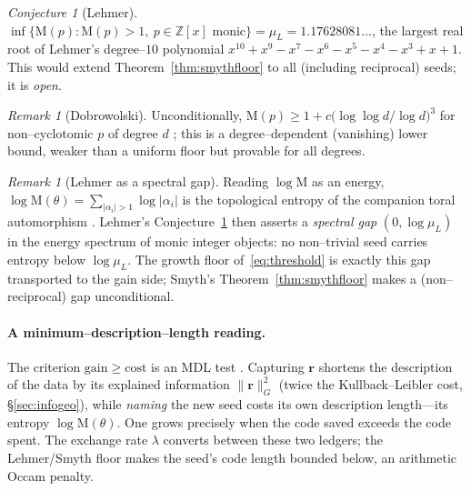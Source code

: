 \documentclass[11pt]{article}
\theoremstyle{plain}
\theoremstyle{definition}
\theoremstyle{remark}
\newtheorem{remark}[theorem]{Remark}
\newtheorem{conjecture}[theorem]{Conjecture}
\newcommand{\Z}{\mathbb{Z}}
\newcommand{\Mah}{\mathrm{M}}
\newcommand{\rr}{\mathbf{r}}
\newcommand{\GG}{G}
\begin{document}
\begin{conjecture}[Lehmer]\label{conj:lehmer}
$\inf\{\Mah(p):\Mah(p)>1,\ p\in\Z[x]\text{ monic}\}=\mu_L=1.17628081\ldots$, the largest real root of
Lehmer's degree--$10$ polynomial $x^{10}+x^9-x^7-x^6-x^5-x^4-x^3+x+1$. This would extend
Theorem~\ref{thm:smythfloor} to all (including reciprocal) seeds; it is \emph{open}.
\end{conjecture}

\begin{remark}[Dobrowolski]\label{rem:dobro}
Unconditionally, $\Mah(p)\ge 1+c\big(\log\log d/\log d\big)^3$ for non--cyclotomic $p$ of degree $d$
\cite{Dobrowolski}; this is a degree--dependent (vanishing) lower bound, weaker than a uniform floor but
provable for all degrees.
\end{remark}

\begin{remark}[Lehmer as a spectral gap]\label{rem:spectralgap}
Reading $\log\Mah$ as an energy, $\log\Mah(\theta)=\sum_{|\alpha_i|>1}\log|\alpha_i|$ is the topological
entropy of the companion toral automorphism \cite{LSW}. Lehmer's Conjecture~\ref{conj:lehmer} then asserts a
\emph{spectral gap} $(0,\log\mu_L)$ in the energy spectrum of monic integer objects: no non--trivial seed
carries entropy below $\log\mu_L$. The growth floor of~\eqref{eq:threshold} is exactly this gap transported
to the gain side; Smyth's Theorem~\ref{thm:smythfloor} makes a (non--reciprocal) gap unconditional.
\end{remark}

\paragraph{A minimum--description--length reading.} The criterion $\mathrm{gain}\ge\mathrm{cost}$ is an
MDL test \cite{Rissanen}. Capturing $\rr$ shortens the description of the data by its explained information
$\lVert\rr\rVert_{\GG}^2$ (twice the Kullback--Leibler cost, \S\ref{sec:infogeo}), while \emph{naming} the new
seed costs its own description length---its entropy $\log\Mah(\theta)$. One grows precisely when the code
saved exceeds the code spent. The exchange rate $\lambda$ converts between these two ledgers; the
Lehmer/Smyth floor makes the seed's code length bounded below, an arithmetic Occam penalty.
\end{document}
